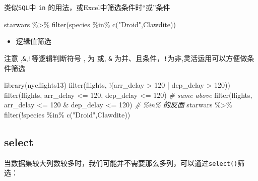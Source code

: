 \documentclass[
]{book}
\newenvironment{Shaded}{\begin{snugshade}}{\end{snugshade}}
\newcommand{\CommentTok}[1]{\textcolor[rgb]{0.56,0.35,0.01}{\textit{#1}}}
\newcommand{\DecValTok}[1]{\textcolor[rgb]{0.00,0.00,0.81}{#1}}
\newcommand{\FunctionTok}[1]{\textcolor[rgb]{0.00,0.00,0.00}{#1}}
\newcommand{\NormalTok}[1]{#1}
\newcommand{\SpecialCharTok}[1]{\textcolor[rgb]{0.00,0.00,0.00}{#1}}
\newcommand{\StringTok}[1]{\textcolor[rgb]{0.31,0.60,0.02}{#1}}
\providecommand{\tightlist}{%
  \setlength{\itemsep}{0pt}\setlength{\parskip}{0pt}}
\begin{document}
类似\texttt{SQL}中 \texttt{in} 的用法，或Excel中筛选条件时``或''条件

\begin{Shaded}
\begin{Highlighting}[]
\NormalTok{starwars }\SpecialCharTok{\%\textgreater{}\%} 
  \FunctionTok{filter}\NormalTok{(species }\SpecialCharTok{\%in\%}  \FunctionTok{c}\NormalTok{(}\StringTok{"Droid"}\NormalTok{,}\StringTok{\textquotesingle{}Clawdite\textquotesingle{}}\NormalTok{))}
\end{Highlighting}
\end{Shaded}

\begin{itemize}
\tightlist
\item
  逻辑值筛选
\end{itemize}

注意\texttt{\textbar{}} ,\texttt{\&},\texttt{!}等逻辑判断符号 , \texttt{\textbar{}}为 或, \texttt{\&} 为并、且条件，\texttt{!}为非,灵活运用可以方便做条件筛选

\begin{Shaded}
\begin{Highlighting}[]
\FunctionTok{library}\NormalTok{(nycflights13)}
\FunctionTok{filter}\NormalTok{(flights, }\SpecialCharTok{!}\NormalTok{(arr\_delay }\SpecialCharTok{\textgreater{}} \DecValTok{120} \SpecialCharTok{|}\NormalTok{ dep\_delay }\SpecialCharTok{\textgreater{}} \DecValTok{120}\NormalTok{))}
\FunctionTok{filter}\NormalTok{(flights, arr\_delay }\SpecialCharTok{\textless{}=} \DecValTok{120}\NormalTok{, dep\_delay }\SpecialCharTok{\textless{}=} \DecValTok{120}\NormalTok{)}
\CommentTok{\# same above}
\FunctionTok{filter}\NormalTok{(flights, arr\_delay }\SpecialCharTok{\textless{}=} \DecValTok{120} \SpecialCharTok{\&}\NormalTok{ dep\_delay }\SpecialCharTok{\textless{}=} \DecValTok{120}\NormalTok{)}
\CommentTok{\# \%in\% 的反面}
\NormalTok{starwars }\SpecialCharTok{\%\textgreater{}\%} 
  \FunctionTok{filter}\NormalTok{(}\SpecialCharTok{!}\NormalTok{species }\SpecialCharTok{\%in\%}  \FunctionTok{c}\NormalTok{(}\StringTok{"Droid"}\NormalTok{,}\StringTok{\textquotesingle{}Clawdite\textquotesingle{}}\NormalTok{))}
\end{Highlighting}
\end{Shaded}

\hypertarget{select}{%
\subsection{select}\label{select}}

当数据集较大列数较多时，我们可能并不需要那么多列，可以通过\texttt{select()}筛选：
\end{document}
